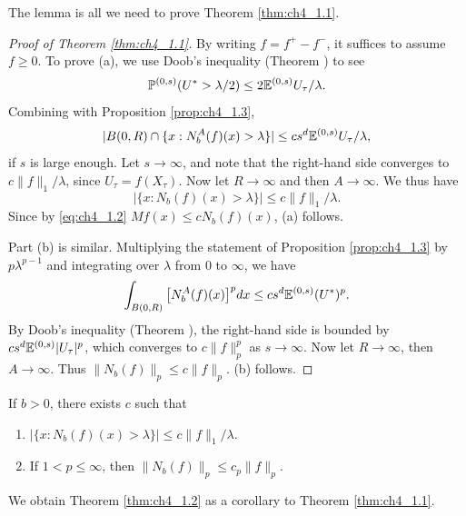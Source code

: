 The lemma is all we need to prove Theorem \ref{thm:ch4_1.1}.

\begin{proof}[Proof of Theorem \ref{thm:ch4_1.1}]
By writing $f = f^+ - f^-$, it suffices to assume $f \geq 0$. To prove (a), we use Doob's inequality (Theorem ) to see
\[
    \mathbb{P}^{(0,s)}(U^* > \lambda/2) \leq 2\mathbb{E}^{(0,s)}U_\tau/\lambda.
\]
Combining with Proposition \ref{prop:ch4_1.3},
\[
    |B(0,R) \cap \{x : N_b^A(f)(x) > \lambda\}| \leq cs^d\mathbb{E}^{(0,s)}U_\tau/\lambda,
\]
if $s$ is large enough. Let $s \to \infty$, and note that the right-hand side converges to $c\|f\|_1/\lambda$, since $U_\tau = f(X_\tau)$. Now let $R \to \infty$ and then $A \to \infty$. We thus have
\[
    |\{x : N_b(f)(x) > \lambda\}| \leq c\|f\|_1/\lambda.
\]
Since by \eqref{eq:ch4_1.2} $Mf(x) \leq cN_b(f)(x)$, (a) follows.


Part (b) is similar. Multiplying the statement of Proposition \ref{prop:ch4_1.3} by $p\lambda^{p-1}$ and integrating over $\lambda$ from $0$ to $\infty$, we have
\[
    \int_{B(0,R)} \big[N_b^A(f)(x)\big]^p dx \leq cs^d\mathbb{E}^{(0,s)}(U^*)^p.
\]
\mnewpage
By Doob's inequality (Theorem ), the right-hand side is bounded by $cs^d\mathbb{E}^{(0,s)}|U_\tau|^p$, which converges to $c\|f\|_p^p$ as $s \to \infty$. Now let $R \to \infty$, then $A \to \infty$. Thus $\|N_b(f)\|_p \leq c\|f\|_p$. (b) follows.
\end{proof}

\begin{corollary}\label{cor:ch4_1.4}
If $b > 0$, there exists $c$ such that
\begin{enumerate}
    \item $|\{x : N_b(f)(x) > \lambda\}| \leq c\|f\|_1/\lambda$.
    \item If $1 < p \leq \infty$, then $\|N_b(f)\|_p \leq c_p\|f\|_p$.
\end{enumerate}
\end{corollary}

We obtain Theorem \ref{thm:ch4_1.2} as a corollary to Theorem \ref{thm:ch4_1.1}.

